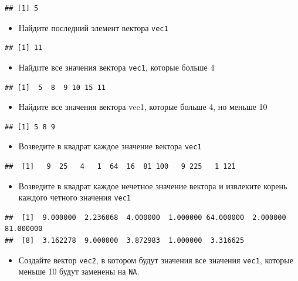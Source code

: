 \documentclass[]{book}
\providecommand{\tightlist}{%
  \setlength{\itemsep}{0pt}\setlength{\parskip}{0pt}}
\begin{document}
\begin{verbatim}
## [1] 5
\end{verbatim}

\begin{itemize}
\tightlist
\item
  Найдите последний элемент вектора \texttt{vec1}
\end{itemize}

\begin{verbatim}
## [1] 11
\end{verbatim}

\begin{itemize}
\tightlist
\item
  Найдите все значения вектора \texttt{vec1}, которые больше 4
\end{itemize}

\begin{verbatim}
## [1]  5  8  9 10 15 11
\end{verbatim}

\begin{itemize}
\tightlist
\item
  Найдите все значения вектора vec1, которые больше 4, но меньше 10
\end{itemize}

\begin{verbatim}
## [1] 5 8 9
\end{verbatim}

\begin{itemize}
\tightlist
\item
  Возведите в квадрат каждое значение вектора \texttt{vec1}
\end{itemize}

\begin{verbatim}
##  [1]   9  25   4   1  64  16  81 100   9 225   1 121
\end{verbatim}

\begin{itemize}
\tightlist
\item
  Возведите в квадрат каждое нечетное значение вектора и извлеките корень каждого четного значения \texttt{vec1}
\end{itemize}

\begin{verbatim}
##  [1]  9.000000  2.236068  4.000000  1.000000 64.000000  2.000000 81.000000
##  [8]  3.162278  9.000000  3.872983  1.000000  3.316625
\end{verbatim}

\begin{itemize}
\tightlist
\item
  Создайте вектор \texttt{vec2}, в котором будут значения все значения \texttt{vec1}, которые меньше 10 будут заменены на \texttt{NA}.
\end{itemize}
\end{document}
